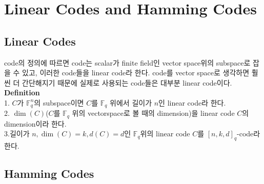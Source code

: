 \documentclass[11pt]{article}
\begin{document}
\section{Linear Codes and Hamming Codes}
\subsection{Linear Codes}

code의 정의에 따르면 code는 scalar가 finite field인 vector space위의 subspace로 잡을 수 있고, 이러한 code들을 linear code라 한다. code를 vector space로 생각하면 훨씬 더 간단해지기 때문에 실제로 사용되는 code들은 대부분 linear code이다.\\
{\bf Definition}\\
1. $C$가 $\mathbb{F}_{q}^{n}$의 subspace이면 $C$를 $\mathbb{F}_{q}$ 위에서 길이가 $n$인 linear code라 한다.\\
2. $\dim(C)$($C$를 $\mathbb{F}_{q}$ 위의 vectorspace로 볼 때의 dimension)을 linear code $C$의 dimension이라 한다.\\
3.길이가 $n, \dim(C)=k,d(C)=d$인 $\mathbb{F}_{q}$위의 linear code $C$를 $[n,k,d]_{q}$-code라 한다.

\subsection{Hamming Codes}
\end{document}
